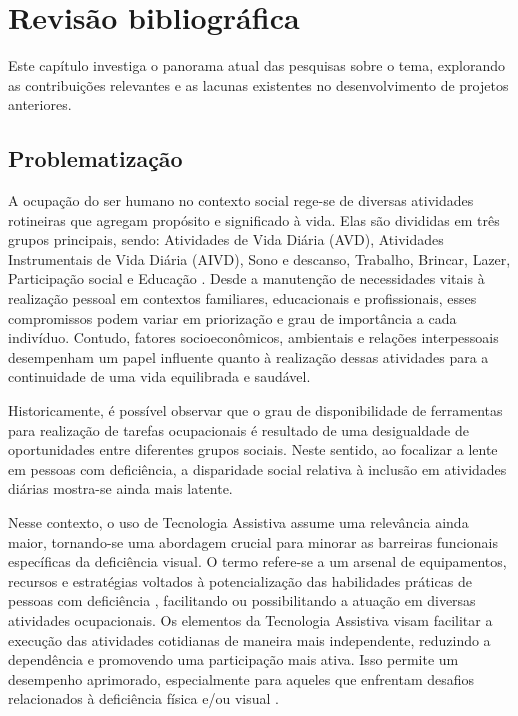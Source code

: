 \chapter{Revisão bibliográfica}
\label{cap:fundamentacao-teorica}
Este capítulo investiga o panorama atual das pesquisas sobre o tema, explorando as contribuições relevantes e as lacunas existentes no desenvolvimento de projetos anteriores.

\section{Problematização}

A ocupação do ser humano no contexto social rege-se de diversas atividades rotineiras que agregam propósito e significado à vida. Elas são divididas em três grupos principais, sendo: Atividades de Vida Diária (AVD), Atividades Instrumentais de Vida Diária (AIVD), Sono e descanso, Trabalho, Brincar, Lazer, Participação social e Educação \cite{aota}. Desde a manutenção de necessidades vitais à realização pessoal em contextos familiares, educacionais e profissionais, esses compromissos podem variar em priorização e grau de importância a cada indivíduo. Contudo, fatores socioeconômicos, ambientais e relações interpessoais desempenham um papel influente quanto à realização dessas atividades para a continuidade de uma vida equilibrada e saudável.

Historicamente, é possível observar que o grau de disponibilidade de ferramentas para realização de tarefas ocupacionais é resultado de uma desigualdade de oportunidades entre diferentes grupos sociais. Neste sentido, ao focalizar a lente em pessoas com deficiência, a disparidade social relativa à inclusão em atividades diárias mostra-se ainda mais latente.

Nesse contexto, o uso de Tecnologia Assistiva assume uma relevância ainda maior, tornando-se uma abordagem crucial para minorar as barreiras funcionais específicas da deficiência visual. O termo refere-se a um arsenal de equipamentos, recursos e estratégias voltados à potencialização das habilidades práticas de pessoas com deficiência \cite{TecnologiaAssistivaDeficienciaVisual}, facilitando ou possibilitando a atuação em diversas atividades ocupacionais. Os elementos da Tecnologia Assistiva visam facilitar a execução das atividades cotidianas de maneira mais independente, reduzindo a dependência e promovendo uma participação mais ativa. Isso permite um desempenho aprimorado, especialmente para aqueles que enfrentam desafios relacionados à deficiência física e/ou visual \cite{BarreirasArquitetonicas}.

